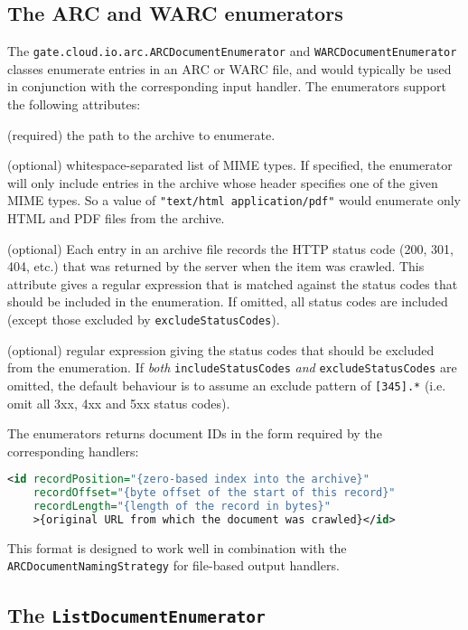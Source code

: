 \subsection{The ARC and WARC enumerators}

The \verb!gate.cloud.io.arc.ARCDocumentEnumerator! and
\verb!WARCDocumentEnumerator! classes enumerate entries in an
ARC or WARC file, and would typically be used in conjunction with the
corresponding input handler.  The enumerators support the following attributes:

\bde
\item[srcFile] (required) the path to the archive to enumerate.
\item[mimeTypes] (optional) whitespace-separated list of MIME types.  If
  specified, the enumerator will only include entries in the archive whose
  header specifies one of the given MIME types.  So a value of
  \verb!"text/html application/pdf"! would enumerate only HTML and PDF files
  from the archive.
\item[includeStatusCodes] (optional) Each entry in an archive file records the
  HTTP status code (200, 301, 404, etc.) that was returned by the server when
  the item was crawled.  This attribute gives a regular expression that is
  matched against the status codes that should be included in the enumeration.
  If omitted, all status codes are included (except those excluded by
  \verb!excludeStatusCodes!).
\item[excludeStatusCodes] (optional) regular expression giving the status codes
  that should be excluded from the enumeration.  If {\em both}
  \verb!includeStatusCodes! {\em and} \verb!excludeStatusCodes! are omitted,
  the default behaviour is to assume an exclude pattern of \verb![345].*! (i.e.
  omit all 3xx, 4xx and 5xx status codes).
\ede

The enumerators returns document IDs in the form required by the corresponding
handlers:

\begin{lstlisting}[language=XML]
<id recordPosition="{zero-based index into the archive}"
    recordOffset="{byte offset of the start of this record}"
    recordLength="{length of the record in bytes}"
    >{original URL from which the document was crawled}</id>
\end{lstlisting}

This format is designed to work well in combination with the
\verb!ARCDocumentNamingStrategy!  for file-based output handlers.

\subsection{The {\tt ListDocumentEnumerator}}

